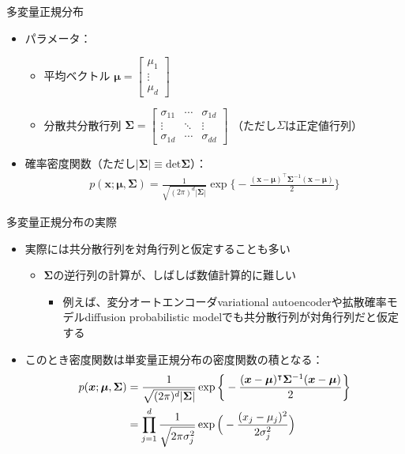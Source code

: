 \documentclass[aspectratio=169,unicode,dvipdfmx,14pt]{beamer}
\begin{document}
\begin{frame}{多変量正規分布}
\begin{itemize}
\item パラメータ：
\begin{itemize}
\item 平均ベクトル
$\bm{\mu} = \begin{bmatrix} \mu_1 \\ \vdots \\ \mu_d \end{bmatrix}$
\item 分散共分散行列
$\bm{\Sigma} = \begin{bmatrix} \sigma_{11} & \cdots & \sigma_{1d} \\ 
\vdots & \ddots & \vdots \\
\sigma_{1d} & \cdots & \sigma_{dd} \end{bmatrix}$
（ただし$\Sigma$は正定値行列）
\end{itemize}
\item 確率密度関数（ただし$| \bm{\Sigma} | \equiv \mbox{det}\bm{\Sigma}$）：
\begin{align}
p(\bm{x};\bm{\mu},\bm{\Sigma}) = \frac{1}{\sqrt{(2\pi)^d|\bm{\Sigma}|}}\exp\bigg\{ - \frac{(\bm{x} - \bm{\mu})^\intercal \bm{\Sigma}^{-1} (\bm{x} -\bm{\mu})}{2} \bigg\}
\end{align}
\end{itemize}
\end{frame}

\begin{frame}{多変量正規分布の実際}
\begin{itemize}
\item 実際には共分散行列を対角行列と仮定することも多い
\begin{itemize}
\item $\bm{\Sigma}$の逆行列の計算が、しばしば数値計算的に難しい
\begin{itemize}
\item 例えば、変分オートエンコーダvariational autoencoderや拡散確率モデルdiffusion probabilistic modelでも共分散行列が対角行列だと仮定する
\end{itemize}
\end{itemize}
\item このとき密度関数は単変量正規分布の密度関数の積となる：
\begin{align}
p(\bm{x};\bm{\mu},\bm{\Sigma}) & = \frac{1}{\sqrt{(2\pi)^d|\bm{\Sigma}|}}\exp\bigg\{ - \frac{(\bm{x} - \bm{\mu})^\intercal \bm{\Sigma}^{-1} (\bm{x} -\bm{\mu})}{2} \bigg\}
\notag \\ & =
\prod_{j=1}^d \frac{1}{\sqrt{2\pi\sigma_j^2}}\exp\Big( - \frac{(x_j - \mu_j)^2}{2\sigma_j^2} \Big)
\end{align}
\end{itemize}
\end{frame}
\end{document}
